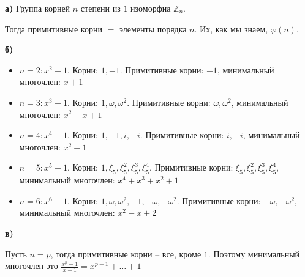 \textbf{а)}
Группа корней $n$ степени из $1$ изоморфна $\mathbb{Z}_n$.

Тогда примитивные корни $=$  элементы порядка $n$. Их, как мы знаем, $\varphi(n)$.

\textbf{б)}

\begin{itemize}
    \item $n = 2: x^2 - 1$. Корни: $1, -1$. Примитивные корни: $-1$, минимальный многочлен: $x+1$ 
    \item $n = 3: x^3 - 1$. Корни: $1, \omega, \omega^2$. Примитивные корни: $\omega, \omega^2$, минимальный многочлен: $x^2 + x + 1$
    \item $n = 4: x^4 - 1$. Корни: $1, -1, i, -i$. Примитивные корни: $i, -i$, минимальный многочлен: $x^2+1$
    \item $n = 5: x^5 - 1$. Корни: $1, \xi_5, \xi_5^2, \xi_5^3, \xi_5^4$. Примитивные корни: $\xi_5, \xi_5^2, \xi_5^3, \xi_5^4$, минимальный многочлен: $x^4 + x^3 + x^2 + 1$
    \item $n = 6: x^6 - 1$. Корни: $1, \omega, \omega^2, -1, -\omega, -\omega^2$. Примитивные корни: $-\omega, -\omega^2$, минимальный многочлен: $x^2 - x + 2$
\end{itemize}

\textbf{в)}

Пусть $n = p$, тогда примитивные корни -- все, кроме $1$. Поэтому минимальный многочлен это $\frac{x^p - 1}{x - 1} = x^{p-1} + \ldots + 1$